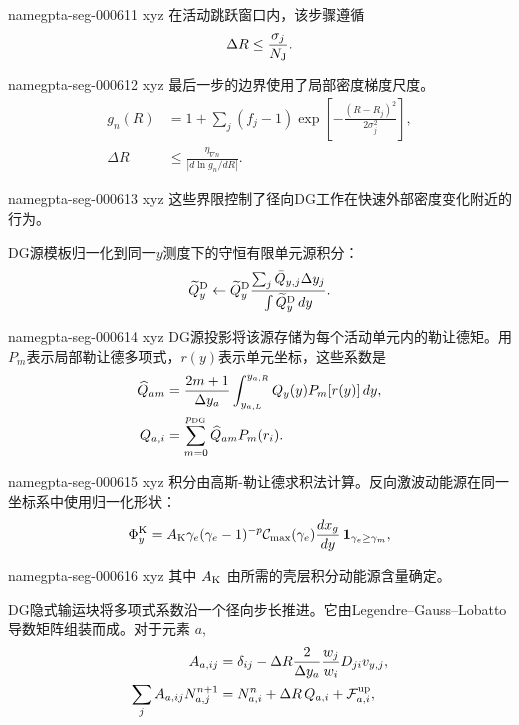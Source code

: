 \documentclass[twocolumn]{aastex702}
\makeatletter
\providecommand{\gptareaderanchor}[1]{\pdfdest name{#1} xyz}%
\providecommand{\gptareaderanchor}[1]{\special{pdf:dest (#1) [ @thispage /XYZ @xpos @ypos null ]}}%
\makeatother
\begin{document}
\gptareaderanchor{gpta-seg-000611}%
在活动跳跃窗口内，该步骤遵循
\begin{equation}
\Delta R\le \frac{\sigma_j}{N_{\rm J}}.
\end{equation}

\gptareaderanchor{gpta-seg-000612}%
最后一步的边界使用了局部密度梯度尺度。
\begin{equation}
\begin{aligned}
g_n(R)&=1+\sum_j(f_j-1)
\exp\left[-\frac{(R-R_j)^2}{2\sigma_j^2}\right],\\
\Delta R&\le \frac{\eta_{\nabla n}}{|d\ln g_n/dR|}.
\end{aligned}
\end{equation}

\gptareaderanchor{gpta-seg-000613}%
这些界限控制了径向DG工作在快速外部密度变化附近的行为。

DG源模板归一化到同一\(y\)测度下的守恒有限单元源积分：
\begin{equation}
\widetilde Q_y^{\rm D}\leftarrow
\widetilde Q_y^{\rm D}
\frac{\sum_j \bar Q_{y,j}\Delta y_j}
{\int \widetilde Q_y^{\rm D}\,dy}.
\end{equation}


\gptareaderanchor{gpta-seg-000614}%
DG源投影将该源存储为每个活动单元内的勒让德矩。用\(P_m\)表示局部勒让德多项式，\(r(y)\)表示单元坐标，这些系数是
\begin{equation}
\begin{aligned}
\widehat Q_{am}&=
\frac{2m+1}{\Delta y_a}
\int_{y_{a,L}}^{y_{a,R}}Q_y(y)P_m[r(y)]\,dy,\\
Q_{a,i}&=\sum_{m=0}^{p_{\rm DG}}\widehat Q_{am}P_m(r_i).
\end{aligned}
\end{equation}

\gptareaderanchor{gpta-seg-000615}%
积分由高斯-勒让德求积法计算。反向激波动能源在同一坐标系中使用归一化形状：
\begin{equation}
\Phi_y^{\rm K}=A_{\rm K}\gamma_e
(\gamma_e-1)^{-p}\mathcal{C}_{\max}(\gamma_e)
\frac{dx_g}{dy}\,\mathbf{1}_{\gamma_e\ge\gamma_m},
\end{equation}

\gptareaderanchor{gpta-seg-000616}%
其中 \(A_{\rm K}\) 由所需的壳层积分动能源含量确定。

DG隐式输运块将多项式系数沿一个径向步长推进。它由Legendre--Gauss--Lobatto导数矩阵组装而成。对于元素 \(a\),
\begin{equation}
\begin{aligned}
A_{a,ij}&=\delta_{ij}
-\Delta R
\frac{2}{\Delta y_a}
\frac{w_j}{w_i}D_{ji}v_{y,j},\\
\sum_j A_{a,ij}N_{a,j}^{n+1}
&=N_{a,i}^{n}+\Delta R\,Q_{a,i}
+\mathcal{F}_{a,i}^{\rm up},
\end{aligned}
\end{equation}
\end{document}

